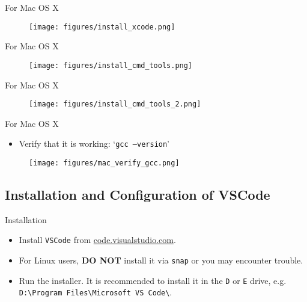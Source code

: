 \documentclass{beamer}
\begin{document}
\begin{frame}{For Mac OS X}
    \begin{figure}[h]
        \centering
        \texttt{[image: figures/install\_xcode.png]}
    \end{figure}
\end{frame}

\begin{frame}{For Mac OS X}
    \begin{figure}[h]
        \centering
        \texttt{[image: figures/install\_cmd\_tools.png]}
    \end{figure}
\end{frame}

\begin{frame}{For Mac OS X}
    \begin{figure}[h]
        \centering
        \texttt{[image: figures/install\_cmd\_tools\_2.png]}
    \end{figure}
\end{frame}

\begin{frame}{For Mac OS X}
    \begin{itemize}
        \item Verify that it is working: `\texttt{gcc --version}'
    \end{itemize}
    \begin{figure}[h]
        \centering
        \texttt{[image: figures/mac\_verify\_gcc.png]}
    \end{figure}
\end{frame}

\subsection{Installation and Configuration of VSCode}

\begin{frame}{Installation}
    \begin{itemize}
        \item Install \texttt{VSCode} from \url{code.visualstudio.com}.
        \item For Linux users, \textbf{DO NOT} install it via \texttt{snap} or you may encounter trouble.
        \pause
        \item Run the installer. It is recommended to install it in the \texttt{D} or \texttt{E} drive, e.g. \texttt{D:\textbackslash Program Files\textbackslash Microsoft VS Code\textbackslash}.
    \end{itemize}
\end{frame}
\end{document}
